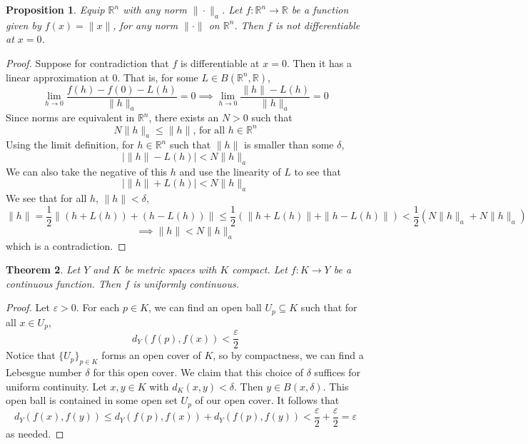 \documentclass{article}
\theoremstyle{plain} %
\newtheorem{thm}{Theorem}
\numberwithin{thm}{section} %
\newtheorem{prop}[thm]{Proposition}
\theoremstyle{definition}
\begin{document}
    \begin{prop}
        Equip \(\mathbb{R}^n\) with any norm \(\|\cdot\| _a\). Let \(f : \mathbb{R}^n \to \mathbb{R}\) be a function given by \(f(x) = \|x\|\), for any norm \(\|\cdot\|\) on \(\mathbb{R}^n\). Then \(f\) is not differentiable at \(x=0\).
    \end{prop}
    \begin{proof}
        Suppose for contradiction that \(f\) is differentiable at \(x=0\). Then it has a linear approximation at \(0\). That is, for some \(L \in B(\mathbb{R}^n, \mathbb{R})\),
        \[
            \lim_{h \to 0} \frac{f(h) - f(0) - L(h)}{\|h\| _a} = 0 \implies \lim_{h \to 0} \frac{\|h\| - L(h)}{\|h\| _a} = 0
        \]
        Since norms are equivalent in \(\mathbb{R}^n\), there exists an \(N > 0\) such that
        \[
            N\|h\| _a \leq \|h\| \text{, for all } h \in \mathbb{R}^n
        \]
        Using the limit definition, for \(h \in \mathbb{R}^n\) such that \(\|h\|\) is smaller than some \(\delta\),
        \[
            \left\vert \|h\| - L(h) \right\vert < N\|h\| _a
        \]
        We can also take the negative of this \(h\) and use the linearity of \(L\) to see that
        \[
            \left\vert \|h\| + L(h) \right\vert < N\|h\| _a
        \]
        We see that for all \(h\), \(\|h\| <\delta\),
        \[
            \|h\| = \frac{1}{2} \|(h + L(h)) + (h - L(h))\| \leq \frac{1}{2} \left(\|h + L(h)\| + \|h - L(h)\|\right) < \frac{1}{2} (N \|h\| _a + N \|h\| _a)
        \]
        \[
            \implies \|h\| < N\|h\| _a
        \]
        which is a contradiction.
        \smallbreak
    \end{proof}

    \begin{thm}
        Let \(Y\) and \(K\) be metric spaces with \(K\) compact. Let \(f: K \to Y\) be a continuous function. Then \(f\) is uniformly continuous.
    \end{thm}
    \begin{proof}
        Let \(\varepsilon > 0\). For each \(p \in K\), we can find an open ball \(U_p \subseteq K\) such that for all \(x \in U_p\),
        \[
            d_Y(f(p), f(x)) < \frac{\varepsilon}{2}
        \]
        Notice that \(\{ U_p \} _{p \in K}\) forms an open cover of \(K\), so by compactness, we can find a Lebesgue number \(\delta\) for this open cover. We claim that this choice of \(\delta\) suffices for uniform continuity. Let \(x,y \in K\) with \(d_K(x,y) < \delta\). Then \(y \in B(x, \delta)\). This open ball is contained in some open set \(U_p\) of our open cover. It follows that
        \[
            d_Y(f(x), f(y)) \leq d_Y(f(p), f(x)) + d_Y(f(p), f(y)) < \frac{\varepsilon}{2} + \frac{\varepsilon}{2} = \varepsilon
        \]
        as needed.
    \end{proof}
\end{document}
